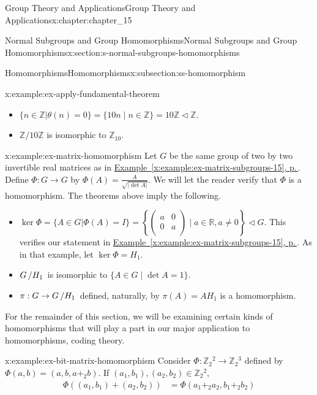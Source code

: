 \documentclass[twoside,10pt,]{book}
\newcommand{\xreffont}{\relax}
\numberwithin{equation}{section}
\begin{document}
\begin{chapterptx}{Group Theory and Applications}{}{Group Theory and Applications}{}{}{x:chapter:chapter_15}
\begin{sectionptx}{Normal Subgroups and Group Homomorphisms}{}{Normal Subgroups and Group Homomorphisms}{}{}{x:section:s-normal-subgroups-homomorphisms}
\begin{subsectionptx}{Homomorphisms}{}{Homomorphisms}{}{}{x:subsection:ss-homomorphism}
\begin{example}{}{x:example:ex-apply-fundamental-theorem}
\begin{itemize}[label=\textbullet]
\item{}\(\{n\in \mathbb{Z}|\theta(n) = 0\} = \{10n \mid n \in \mathbb{Z}\}= 10\mathbb{Z} \triangleleft  \mathbb{Z}\).%
\item{}\(\mathbb{Z}/10\mathbb{Z}\) is isomorphic to \(\mathbb{Z}_{10}\).%
\end{itemize}
%
\end{example}
\begin{example}{}{x:example:ex-matrix-homomorphism}%
Let \(G\) be the same group of two by two invertible real matrices as in \hyperref[x:example:ex-matrix-subgroups-15]{Example~{\xreffont\ref{x:example:ex-matrix-subgroups-15}}, p.\,\pageref{x:example:ex-matrix-subgroups-15}}.  Define \(\Phi: G \rightarrow G\) by \(\Phi(A) = \frac{A}{\sqrt{\lvert \det  A \rvert }}\). We will let the reader verify that \(\Phi\) is a homomorphism. The theorems above imply the following.%
\begin{itemize}[label=\textbullet]
\item{}\(\ker  \Phi  = \{A\in G |\Phi (A) =I\} = \left\{\left(
\begin{array}{cc}
a & 0 \\
0 & a \\
\end{array}
\right) \mid a\in \mathbb{R},a\neq 0\right\}\triangleleft G\).  This verifies our statement in \hyperref[x:example:ex-matrix-subgroups-15]{Example~{\xreffont\ref{x:example:ex-matrix-subgroups-15}}, p.\,\pageref{x:example:ex-matrix-subgroups-15}}. As in that example, let \(\ker
\Phi  = H_1\).%
\item{}\(G\left/H_1\right.\) is isomorphic to \(\{A \in G \mid \det A= 1\}\).%
\item{}\(\pi: G \rightarrow G\left/H_1\right.\) defined, naturally, by \(\pi(A) =A H_1\) is a homomorphism.%
\end{itemize}
%
\end{example}
For the remainder of this section, we will be examining certain kinds of homomorphisms that will play a part in our major application to homomorphisms, coding theory.%
\begin{example}{}{x:example:ex-bit-matrix-homomorphism}%
Consider  \(\Phi :\mathbb{Z}_2{}^2\to \mathbb{Z}_2{}^3\) defined by \(\Phi (a, b) = \left(a, b, a +_2 b\right)\).   If \(\left(a_1,b_1\right), \left(a _2 , b_2 \right) \in  \mathbb{Z}_2{}^2\),%
\begin{equation*}
\begin{split}
\Phi\left(\left(a_1,b_1\right)+\left(a _2 , b_2 \right)\right) &= \Phi\left(a_1+_2a_2,b_1 +_2 b_2 \right)\\

\end{split}
\end{equation*}
\end{example}
\end{subsectionptx}
\end{sectionptx}
\end{chapterptx}
\end{document}
